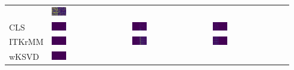 \begin{tabular}{m{}*{3}{M{0.21\textwidth}}}
&\includegraphics[width=0.2\textwidth]{img/chapitre4/figure15/synth/Synth_3S_band_2.png}
\\
CLS
&\includegraphics[width=0.2\textwidth]{img/chapitre4/figure15/synth/Synth_CLS_band_0.png}
&\includegraphics[width=0.2\textwidth]{img/chapitre4/figure15/synth/Synth_CLS_band_1.png}
&\includegraphics[width=0.2\textwidth]{img/chapitre4/figure15/synth/Synth_CLS_band_2.png}
\\
ITKrMM
&\includegraphics[width=0.2\textwidth]{img/chapitre4/figure15/synth/Synth_ITKrMM_matlab_band_0.png}
&\includegraphics[width=0.2\textwidth]{img/chapitre4/figure15/synth/Synth_ITKrMM_matlab_band_1.png}
&\includegraphics[width=0.2\textwidth]{img/chapitre4/figure15/synth/Synth_ITKrMM_matlab_band_2.png}
\\
wKSVD
&\includegraphics[width=0.2\textwidth]{img/chapitre4/figure15/synth/Synth_wKSVD_matlab_band_0.png}

\end{tabular}
